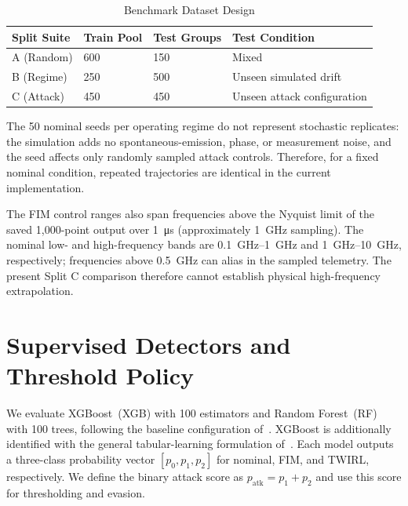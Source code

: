 \documentclass[journal,twocolumn]{IEEEtran}
\newcommand{\patk}{p_{\mathrm{atk}}}
\begin{document}
\begin{table}[t]
  \centering
  \caption{Benchmark Dataset Design}
  \label{tab:split_design}
  \renewcommand{\arraystretch}{1.15}
  \begin{tabular}{@{}llll@{}}
    \toprule
    Split Suite & Train Pool & Test Groups & Test Condition \\
    \midrule
    A (Random)   & 600 & 150 & Mixed \\
    B (Regime)  & 250 & 500 & Unseen simulated drift \\
    C (Attack)  & 450 & 450 & Unseen attack configuration \\
    \bottomrule
  \end{tabular}
\end{table}

The 50 nominal seeds per operating regime do not represent stochastic replicates:
the simulation adds no spontaneous-emission, phase, or measurement noise, and the
seed affects only randomly sampled attack controls. Therefore, for a fixed nominal
condition, repeated trajectories are identical in the current implementation.

The FIM control ranges also span frequencies above the Nyquist limit of the saved
1{,}000-point output over \SI{1}{\micro\second} (approximately \SI{1}{\giga\hertz}
sampling). The nominal low- and high-frequency bands
are \SIrange{0.1}{1}{\giga\hertz} and \SIrange{1}{10}{\giga\hertz}, respectively;
frequencies above \SI{0.5}{\giga\hertz} can alias in the sampled telemetry. The
present Split C comparison therefore cannot establish physical high-frequency
extrapolation.

\section{Supervised Detectors and Threshold Policy}
\label{sec:detectors}

We evaluate XGBoost~(XGB) with 100 estimators and Random Forest~(RF) with 100 trees,
following the baseline configuration of~\cite{basepaper}. XGBoost is additionally
identified with the general tabular-learning formulation of~\cite{chen2016xgboost}.
Each model outputs a three-class probability vector $[p_0,p_1,p_2]$ for nominal,
FIM, and TWIRL, respectively. We define the binary attack score as
$\patk=p_1+p_2$ and use this score for thresholding and evasion.
\end{document}
